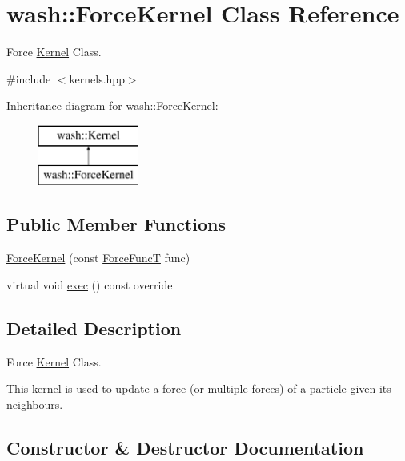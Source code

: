 \hypertarget{classwash_1_1ForceKernel}{}\section{wash\+:\+:Force\+Kernel Class Reference}
\label{classwash_1_1ForceKernel}


Force \mbox{\hyperlink{classwash_1_1Kernel}{Kernel}} Class.  




{\ttfamily \#include $<$kernels.\+hpp$>$}

Inheritance diagram for wash\+:\+:Force\+Kernel\+:\begin{figure}[H]
\begin{center}
\leavevmode
\includegraphics[height=2.000000cm]{classwash_1_1ForceKernel}
\end{center}
\end{figure}
\subsection*{Public Member Functions}
\begin{DoxyCompactItemize}
\item 
\mbox{\hyperlink{classwash_1_1ForceKernel_a5dd87d8036d74c210c51fb6aa97a3de8}{Force\+Kernel}} (const \mbox{\hyperlink{namespacewash_a3687ea698f8cb8c077d728e5d74de495}{Force\+FuncT}} func)
\item 
virtual void \mbox{\hyperlink{classwash_1_1ForceKernel_aa815514d4e9af5ebb056dbe8f1d5a720}{exec}} () const override
\end{DoxyCompactItemize}


\subsection{Detailed Description}
Force \mbox{\hyperlink{classwash_1_1Kernel}{Kernel}} Class. 

This kernel is used to update a force (or multiple forces) of a particle given its neighbours. 

\subsection{Constructor \& Destructor Documentation}
\mbox{\label{classwash_1_1ForceKernel_a5dd87d8036d74c210c51fb6aa97a3de8}} 
